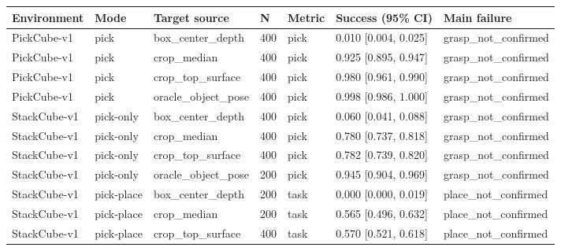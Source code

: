 \begin{tabular}{lllllll}
\toprule
Environment & Mode & Target source & N & Metric & Success (95\% CI) & Main failure \\
\midrule
PickCube-v1 & pick & box\_center\_depth & 400 & pick & 0.010 [0.004, 0.025] & grasp\_not\_confirmed \\
PickCube-v1 & pick & crop\_median & 400 & pick & 0.925 [0.895, 0.947] & grasp\_not\_confirmed \\
PickCube-v1 & pick & crop\_top\_surface & 400 & pick & 0.980 [0.961, 0.990] & grasp\_not\_confirmed \\
PickCube-v1 & pick & oracle\_object\_pose & 400 & pick & 0.998 [0.986, 1.000] & grasp\_not\_confirmed \\
StackCube-v1 & pick-only & box\_center\_depth & 400 & pick & 0.060 [0.041, 0.088] & grasp\_not\_confirmed \\
StackCube-v1 & pick-only & crop\_median & 400 & pick & 0.780 [0.737, 0.818] & grasp\_not\_confirmed \\
StackCube-v1 & pick-only & crop\_top\_surface & 400 & pick & 0.782 [0.739, 0.820] & grasp\_not\_confirmed \\
StackCube-v1 & pick-only & oracle\_object\_pose & 200 & pick & 0.945 [0.904, 0.969] & grasp\_not\_confirmed \\
StackCube-v1 & pick-place & box\_center\_depth & 200 & task & 0.000 [0.000, 0.019] & place\_not\_confirmed \\
StackCube-v1 & pick-place & crop\_median & 200 & task & 0.565 [0.496, 0.632] & place\_not\_confirmed \\
StackCube-v1 & pick-place & crop\_top\_surface & 400 & task & 0.570 [0.521, 0.618] & place\_not\_confirmed \\
\bottomrule
\end{tabular}
